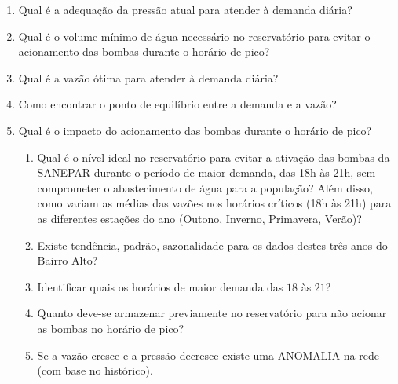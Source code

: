 \begin{enumerate}[start=1, label={\textbf{Q} \arabic*}]
	\item \label{q1} Qual é a adequação da pressão atual para atender à demanda diária?
	\item \label{q2} Qual é o volume mínimo de água necessário no reservatório para evitar o acionamento das bombas durante o horário de pico? 
	\item \label{q3} Qual é a vazão ótima para atender à demanda diária?
	\item \label{q4} Como encontrar o ponto de equilíbrio entre a demanda e a vazão?
	\item \label{q5} Qual é o impacto do acionamento das bombas durante o horário de pico?
	 
	\begin{enumerate}[label=\alph*.]
	\item \label{q5:a} Qual é o nível ideal no reservatório para evitar a ativação das bombas da SANEPAR durante o período de maior demanda, das 18h às 21h, sem comprometer o abastecimento de água para a população? Além disso, como variam as médias das vazões nos horários críticos (18h às 21h) para as diferentes estações do ano (Outono, Inverno, Primavera, Verão)? 
	\item \label{q5:b} Existe tendência, padrão, sazonalidade para os dados destes três anos do Bairro Alto?
	\item \label{q5:c} Identificar quais os horários de maior demanda das $18$ às $21$?
	\item \label{q5:d} Quanto deve-se armazenar previamente no reservatório para não acionar as bombas no horário de pico?
	\item \label{q5:e} Se a vazão cresce e a pressão decresce existe uma ANOMALIA na rede (com base no histórico).	
	\end{enumerate}
\end{enumerate}
